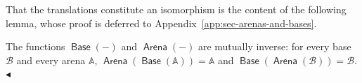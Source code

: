 \documentclass{lipics-v2021}
\newcommand{\fillBox}{\hfill$\blacktriangleleft$}
\newcommand{\base}[1]{\mathcal{#1}}                    %
\newcommand{\arena}[1]{\mathbb{#1}}                     %
\newcommand{\brule}[1]{\triangleright{#1}}         %
\newcommand{\atree}[2]{#1 \Rightarrow #2}              %
\newcommand{\tobase}[1]{\mathrel{\textsf{Base}}(#1)}            %
\newcommand{\toarena}[1]{\mathrel{\textsf{Arena}}(#1)}           %
\begin{document}
That the translations constitute an isomorphism is the content of the
following lemma, whose proof is deferred to
Appendix~\ref{app:sec-arenas-and-bases}.
\begin{lemma}
\label{lemma:inverse}
The functions $\tobase{-}$ and $\toarena{-}$ are mutually inverse: for every base $\base{B}$ and every arena $\arena{A}$,
$\toarena{\tobase{\arena{A}}} = \arena{A}$ and $\tobase{\toarena{\base{B}}} = \base{B}$.
\fillBox
\end{lemma}
%
%
%
%
\end{document}
